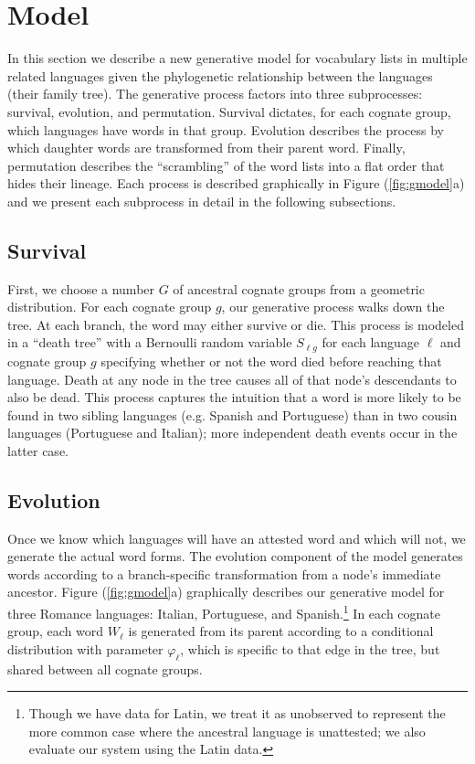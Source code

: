 \documentclass[11pt,a4paper]{article}
\begin{document}
\section{Model}

In this section we describe a new generative model for vocabulary
lists in multiple related languages given the phylogenetic relationship
between the languages (their family tree). The generative process
factors into three subprocesses: survival, evolution, and permutation.
Survival dictates, for each cognate group, which languages have
words in that group. Evolution describes the process by which
daughter words are transformed from their parent word. Finally,
permutation describes the ``scrambling'' of the word lists into a
flat order that hides their lineage. Each process is described
graphically in Figure (\ref{fig:gmodel}a) and we present each
subprocess in detail in the following subsections.

\subsection{Survival}
\label{sec:survival}

First, we choose a number $G$ of ancestral cognate groups from a
geometric distribution. For each cognate group $g$, our generative
process walks down the tree.  At each branch, the word may either
survive or die.  This process is modeled in a ``death tree'' with
a Bernoulli random variable $S_{\ell g}$ for each language $\ell$
and cognate group $g$ specifying whether or not the word died before
reaching that language.  Death at any node in the tree causes all
of that node's descendants to also be dead. This process captures
the intuition that a word is more likely to be found in two sibling
languages (e.g. Spanish and Portuguese) than in two cousin languages
(Portuguese and Italian); more independent death events occur in
the latter case.

\subsection{Evolution}

Once we know which languages will have an attested word and which
will not, we generate the actual word forms. The evolution component
of the model generates words according to a branch-specific
transformation from a node's immediate ancestor. Figure (\ref{fig:gmodel}a)
graphically describes our generative model for three Romance
languages: Italian, Portuguese, and Spanish.\footnote{Though we
have data for Latin, we treat it as unobserved to represent the
more common case where the ancestral language is unattested; we
also evaluate our system using the Latin data.} In each cognate
group, each word $W_\ell$ is generated from its parent according
to a conditional distribution with parameter $\varphi_\ell$, which
is specific to that edge in the tree, but shared between all cognate
groups.
\end{document}
